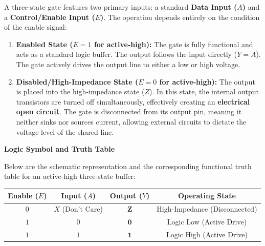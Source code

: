 \documentclass[12pt,a3paper]{article}
\begin{document}
\begin{enumerate}
\begin{tcolorbox}[enhanced,breakable,ansbox,colback=cA!4,colframe=cA,boxrule=0.8pt,arc=5pt,title={\textbf{Answer}},fonttitle=\bfseries\color{white},colbacktitle=cA]
A three-state gate features two primary inputs: a standard \textbf{Data Input ($A$)} and a \textbf{Control/Enable Input ($E$)}. The operation depends entirely on the condition of the enable signal:

\begin{enumerate}
    \item \textbf{Enabled State ($E = 1$ for active-high):} The gate is fully functional and acts as a standard logic buffer. The output follows the input directly ($Y = A$). The gate actively drives the output line to either a low or high voltage.
    \item \textbf{Disabled/High-Impedance State ($E = 0$ for active-high):} The output is placed into the high-impedance state ($Z$). In this state, the internal output transistors are turned off simultaneously, effectively creating an \textbf{electrical open circuit}. The gate is disconnected from its output pin, meaning it neither sinks nor sources current, allowing external circuits to dictate the voltage level of the shared line.
\end{enumerate}

\vspace{0.3cm}
\textbf{Logic Symbol and Truth Table}

Below are the schematic representation and the corresponding functional truth table for an active-high three-state buffer:

\begin{center}

\vspace{0.4cm}
\renewcommand{\arraystretch}{1.3}
\begin{tabular}{|c|c||c|c|}
\hline
\textbf{Enable ($E$)} & \textbf{Input ($A$)} & \textbf{Output ($Y$)} & \textbf{Operating State} \\
\hline
$0$ & $X$ (Don't Care) & $\mathbf{Z}$ & High-Impedance (Disconnected) \\
\hline
$1$ & $0$ & $\mathbf{0}$ & Logic Low (Active Drive) \\
\hline
$1$ & $1$ & $\mathbf{1}$ & Logic High (Active Drive) \\
\hline
\end{tabular}


\end{center}
\end{tcolorbox}
\end{enumerate}
\end{document}
